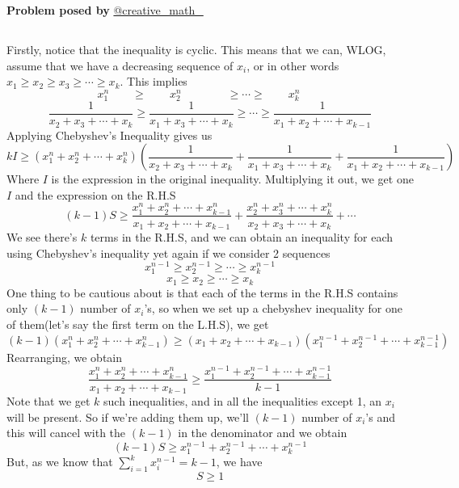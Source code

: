 \documentclass[12pt]{article}
\begin{document}
\begin{flushright}
\textbf{Problem posed by}
\textcolor{RoyalBlue2}{\href{https://www.instagram.com/creative_math_/}{@creative\_math\_}}
\end{flushright}




\subsection*{}
Firstly, notice that the inequality is cyclic. This means that we can, WLOG, assume that we have a decreasing sequence of $x_i$, or in other words $x_1 \geq x_2 \geq x_3 \geq \cdots \geq x_k$. This implies 
$$ x_1^n \quad \quad   \geq \quad \quad x_2^n \quad \quad \quad \quad    \geq  \cdots \geq \quad \quad x_k^n \quad \quad   $$
$$ \frac{1}{x_2 + x_3 + \cdots + x_k} \geq \frac{1}{x_1 + x_3 + \cdots + x_k} \geq \cdots \geq \frac{1}{x_1 + x_2+  \cdots + x_{k-1}}   $$
Applying Chebyshev's Inequality gives us 
$$ kI \geq (x_1^n+x_2^n + \cdots + x_k^n) \left( \frac{1}{x_2+x_3 + \cdots+x_k} + \frac{1}{x_1+x_3 + \cdots+x_k}  + \frac{1}{x_1+x_2+\cdots+x_{k-1}}  \right)$$
Where $I$ is the expression in the original inequality. Multiplying it out, we get one $I$ and the expression on the R.H.S
$$ (k-1)S \geq \frac{x_1^n+x_2^n+\cdots+x_{k-1}^n}{x_1+x_2+\cdots+x_{k-1}} + \frac{x_2^n+x_3^n+\cdots+x_k^n}{x_2+x_3+\cdots+x_k} + \cdots   $$
We see there's $k$ terms in the R.H.S, and we can obtain an inequality for each using Chebyshev's inequality yet again if we consider 2 sequences 
$$ x_1^{n-1} \geq x_2^{n-1} \geq \cdots \geq x_k^{n-1}  $$
$$ x_1 \geq x_2 \geq \cdots \geq x_k $$
One thing to be cautious about is that each of the terms in the R.H.S contains only $(k-1)$ number of $x_i$'s, so when we set up a chebyshev inequality for one of them(let's say the first term on the L.H.S), we get 
$$ (k-1)(x_1^n+x_2^n+\cdots + x_{k-1}^n) \geq (x_1 + x_2 + \cdots +x_{k-1})(x_1^{n-1}+x_2^{n-1}+\cdots + x_{k-1}^{n-1}) $$
Rearranging, we obtain 
$$ \frac{x_1^n+x_2^n+\cdots+x_{k-1}^n}{x_1+x_2+\cdots+x_{k-1}} \geq \frac{x_1^{n-1}+x_2^{n-1}+\cdots + x_{k-1}^{n-1}}{k-1} $$
Note that we get $k$ such inequalities, and in all the inequalities except 1, an $x_i$ will be present. So if we're adding them up, we'll $(k-1)$ number of $x_i$'s and this will cancel with the $(k-1)$ in the denominator and we obtain 
$$ (k-1)S \geq x_1^{n-1}+x_2^{n-1}+ \cdots + x_k^{n-1} $$
But, as we know that $\displaystyle \sum_{i=1}^{k} x_i^{n-1} = k-1 $, we have 
$$ S \geq 1 $$
\end{document}
